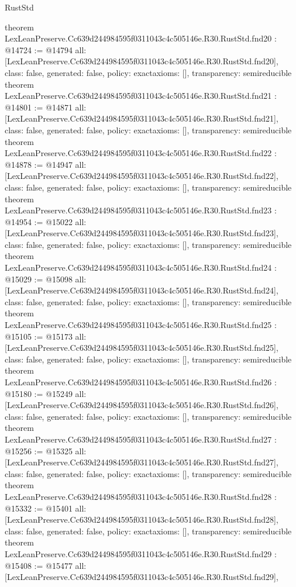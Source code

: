 \begin{lexlean}{RustStd}
\begin{coremodule}
{}
theorem LexLeanPreserve.Cc639d244984595f0311043c4c505146e.R30.RustStd.fnd20 : @14724 := @14794 {
  all: [LexLeanPreserve.Cc639d244984595f0311043c4c505146e.R30.RustStd.fnd20],
  class: false,
  generated: false,
  policy: exact{axioms: []},
  transparency: semireducible
}
theorem LexLeanPreserve.Cc639d244984595f0311043c4c505146e.R30.RustStd.fnd21 : @14801 := @14871 {
  all: [LexLeanPreserve.Cc639d244984595f0311043c4c505146e.R30.RustStd.fnd21],
  class: false,
  generated: false,
  policy: exact{axioms: []},
  transparency: semireducible
}
theorem LexLeanPreserve.Cc639d244984595f0311043c4c505146e.R30.RustStd.fnd22 : @14878 := @14947 {
  all: [LexLeanPreserve.Cc639d244984595f0311043c4c505146e.R30.RustStd.fnd22],
  class: false,
  generated: false,
  policy: exact{axioms: []},
  transparency: semireducible
}
theorem LexLeanPreserve.Cc639d244984595f0311043c4c505146e.R30.RustStd.fnd23 : @14954 := @15022 {
  all: [LexLeanPreserve.Cc639d244984595f0311043c4c505146e.R30.RustStd.fnd23],
  class: false,
  generated: false,
  policy: exact{axioms: []},
  transparency: semireducible
}
theorem LexLeanPreserve.Cc639d244984595f0311043c4c505146e.R30.RustStd.fnd24 : @15029 := @15098 {
  all: [LexLeanPreserve.Cc639d244984595f0311043c4c505146e.R30.RustStd.fnd24],
  class: false,
  generated: false,
  policy: exact{axioms: []},
  transparency: semireducible
}
theorem LexLeanPreserve.Cc639d244984595f0311043c4c505146e.R30.RustStd.fnd25 : @15105 := @15173 {
  all: [LexLeanPreserve.Cc639d244984595f0311043c4c505146e.R30.RustStd.fnd25],
  class: false,
  generated: false,
  policy: exact{axioms: []},
  transparency: semireducible
}
theorem LexLeanPreserve.Cc639d244984595f0311043c4c505146e.R30.RustStd.fnd26 : @15180 := @15249 {
  all: [LexLeanPreserve.Cc639d244984595f0311043c4c505146e.R30.RustStd.fnd26],
  class: false,
  generated: false,
  policy: exact{axioms: []},
  transparency: semireducible
}
theorem LexLeanPreserve.Cc639d244984595f0311043c4c505146e.R30.RustStd.fnd27 : @15256 := @15325 {
  all: [LexLeanPreserve.Cc639d244984595f0311043c4c505146e.R30.RustStd.fnd27],
  class: false,
  generated: false,
  policy: exact{axioms: []},
  transparency: semireducible
}
theorem LexLeanPreserve.Cc639d244984595f0311043c4c505146e.R30.RustStd.fnd28 : @15332 := @15401 {
  all: [LexLeanPreserve.Cc639d244984595f0311043c4c505146e.R30.RustStd.fnd28],
  class: false,
  generated: false,
  policy: exact{axioms: []},
  transparency: semireducible
}
theorem LexLeanPreserve.Cc639d244984595f0311043c4c505146e.R30.RustStd.fnd29 : @15408 := @15477 {
  all: [LexLeanPreserve.Cc639d244984595f0311043c4c505146e.R30.RustStd.fnd29],
}
\end{coremodule}
\end{lexlean}
